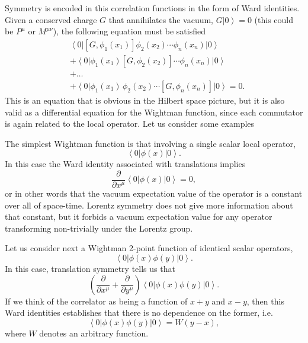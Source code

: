 \documentclass[a4paper,12pt]{article}
\newcommand{\ket}[1]{\left| #1 \right\rangle}
\newcommand{\bra}[1]{\left\langle #1 \right|}
\numberwithin{equation}{section}
\begin{document}
Symmetry is encoded in this correlation functions in the form of Ward identities. Given a conserved charge $G$ that annihilates the vacuum, $G \ket{0} = 0$ (this could be $P^\mu$ or $M^{\mu\nu}$), the following equation must be satisfied
\begin{align}
	& \bra{0} \left[ G, \phi_1(x_1) \right] \phi_2(x_2) \cdots 
	\phi_n(x_n) \ket{0}
	\nonumber \\
	& + \bra{0} \phi_1(x_1) \left[ G, \phi_2(x_2) \right] \cdots 
	\phi_n(x_n) \ket{0}
	\nonumber \\
	& + \ldots
	\nonumber \\
	& + \bra{0} \phi_1(x_1) \, \phi_2(x_2) \cdots 
	\left[ G, \phi_n(x_n) \right] \ket{0} = 0.
\end{align}
This is an equation that is obvious in the Hilbert space picture, but it is also valid as a differential equation for the Wightman function, since each commutator is again related to the local operator. Let us consider some examples

The simplest Wightman function is that involving a single scalar local operator, 
\begin{equation}
	\bra{0} \phi(x) \ket{0}.
\end{equation}
In this case the Ward identity associated with translations implies
\begin{equation}
	\frac{\partial}{\partial x^\mu}
	\bra{0} \phi(x) \ket{0} = 0,
\end{equation}
or in other words that the vacuum expectation value of the operator is a constant over all of space-time. Lorentz symmetry does not give more information about that constant, but it forbids a vacuum expectation value for any operator transforming non-trivially under the Lorentz group.

Let us consider next a Wightman 2-point function of identical scalar operators,
\begin{equation}
	\bra{0} \phi(x) \phi(y) \ket{0}.
\end{equation}
In this case, translation symmetry tells us that
\begin{equation}
	\left( \frac{\partial}{\partial x^\mu}
	+ \frac{\partial}{\partial y^\mu} \right)
	\bra{0} \phi(x) \phi(y) \ket{0}.
\end{equation}
If we think of the correlator as being a function of $x + y$ and $x - y$, then this Ward identities establishes that there is no dependence on the former, i.e.~
\begin{equation}
	\bra{0} \phi(x) \phi(y) \ket{0} = W(y - x),
	\label{eq:W}
\end{equation}
where $W$ denotes an arbitrary function.
\end{document}
